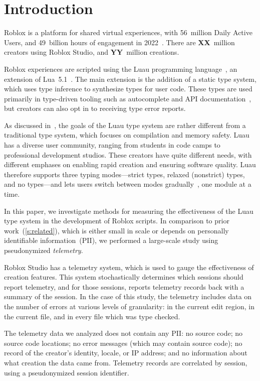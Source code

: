 \documentclass[english,submission,cleveref]{programming}
\begin{document}
\section{Introduction}
\label{s:introduction}

{Roblox} is a platform for {shared virtual experiences},
with 56~million Daily Active Users, and 49~billion hours of engagement in
2022~\cite{roblox-quarterly-results}.
There are \textbf{XX}~million creators using {Roblox Studio},
and \textbf{YY}~million creations.

{Roblox experiences} are scripted using the 
{Luau} programming language~\cite{luau-lang.org},
an extension of {Lua~5.1~\cite{lua}}.
The main extension is the addition of a static type system, which uses
type inference to synthesize types for user code. These types
are used primarily in type-driven tooling such as autocomplete
and API documentation~\cite{luau-autocomplete},
but creators can also opt in to receiving type error reports.

As discussed in~\cite{bfj-hatra-2021},
the goals of the {Luau} type system are rather different from
a traditional type system, which focuses on compilation and memory safety.
{Luau} has a diverse user community, ranging from
students in code camps to professional development studios. These
creators have quite different needs, with different emphases on
enabling rapid creation and ensuring software quality.
{Luau} therefore supports three typing modes---strict types,
relaxed (nonstrict) types, and no types---and lets users switch
between modes gradually~\cite{st-sfp-2006,tfffgksst-snapl-2017}, one module at a time.

In this paper, we investigate methods for measuring the effectiveness
of the {Luau} type system in the development of {Roblox} scripts.
In comparison to prior work~(\cref{s:related}), which is either small in scale
or depends on personally identifiable information~(PII),
we performed a large-scale study using pseudonymized \emph{telemetry}.

{Roblox Studio} has a telemetry system, which is used to gauge
the effectiveness of creation features. This system stochastically
determines which sessions should report telemetry, and for those
sessions, reports telemetry records back with a summary of the
session. In the case of this study, the telemetry includes data on the
number of errors at various levels of granularity: in the current edit
region, in the current file, and in every file which was type
checked.

The telemetry data we analyzed does not contain any PII:
no source code;
no source code locations;
no error messages (which may contain source code);
no record of the creator's identity, locale, or IP address;
and no information about what creation the data came from.
Telemetry records are correlated by session, using a pseudonymized
session identifier.
\end{document}
